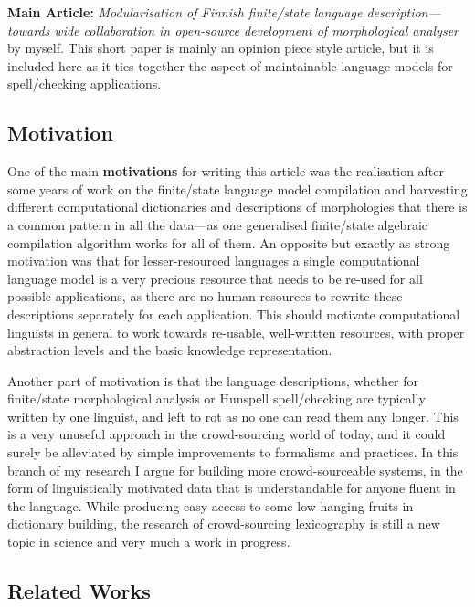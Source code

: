 \documentclass[officiallayout,final]{unihelcompling}
\begin{document}
\textbf{Main Article:} \emph{Modularisation of Finnish finite\-/state language 
description—towards wide collaboration in open-source development of
morphological analyser} by myself. This short paper is mainly an opinion
piece style article, but it is included here as it ties together the
aspect of maintainable language models for spell\-/checking applications.

\subsection{Motivation}

One of the main \textbf{motivations} for writing this article was the
realisation after some years of work on the finite\-/state language model
compilation and harvesting different computational dictionaries and
descriptions of morphologies that there is a common pattern in all the
data---as one generalised finite\-/state algebraic compilation algorithm works
for all of them. An opposite but exactly as strong motivation was that for
lesser-resourced languages a single computational language model is a very
precious resource that needs to be re-used for all possible applications, as
there are no human resources to rewrite these descriptions separately for each
application. This should motivate computational linguists in general to work
towards re-usable, well-written resources, with proper abstraction levels and
the basic knowledge representation.

Another part of motivation is that the language descriptions, whether for
finite\-/state morphological analysis or Hunspell spell\-/checking are typically
written by one linguist, and left to rot as no one can read them any longer.
This is a very unuseful approach in the crowd-sourcing world of today, and it
could surely be alleviated by simple improvements to formalisms and practices.
In this branch of my research I argue for building more crowd-sourceable
systems, in the form of linguistically motivated data that is understandable
for anyone fluent in the language. While producing easy access to some
low-hanging fruits in dictionary building, the research of crowd-sourcing
lexicography is still a new topic in science and very much a work in progress.

\subsection{Related Works}
\end{document}
